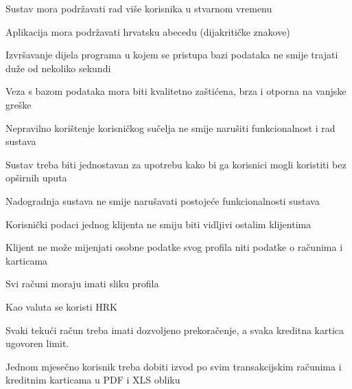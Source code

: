 			 \begin{packed_item}
			 	\item Sustav mora podržavati rad više korisnika u stvarnom vremenu
			 	\item Aplikacija mora podržavati hrvatsku abecedu (dijakritičke znakove)
			 	\item Izvršavanje dijela programa u kojem se pristupa bazi podataka ne smije 
			 	trajati duže od nekoliko sekundi 
			 	\item Veza s bazom podataka mora biti kvalitetno zaštićena, brza i otporna na vanjske
			 	greške
			 	\item Nepravilno korištenje korisničkog sučelja ne smije narušiti funkcionalnost
			 	i rad sustava	
			 	\item Sustav treba biti jednostavan za upotrebu kako bi ga korisnici mogli koristiti
			 	bez opširnih uputa
			 	\item Nadogradnja sustava ne smije narušavati postojeće funkcionalnosti sustava
			 	\item Korisnički podaci jednog klijenta ne smiju biti vidljivi ostalim klijentima
			 	\item Klijent ne može mijenjati osobne podatke svog profila niti podatke o računima
			 	i karticama
			 	\item Svi računi moraju imati sliku profila
			 	\item Kao valuta se koristi HRK
			 	\item Svaki tekući račun treba imati dozvoljeno prekoračenje, a svaka kreditna kartica ugovoren limit.
			 	\item Jednom mjesečno korisnik treba dobiti izvod po svim transakcijskim
			 	računima i kreditnim karticama u PDF i XLS obliku
			 \end{packed_item}
